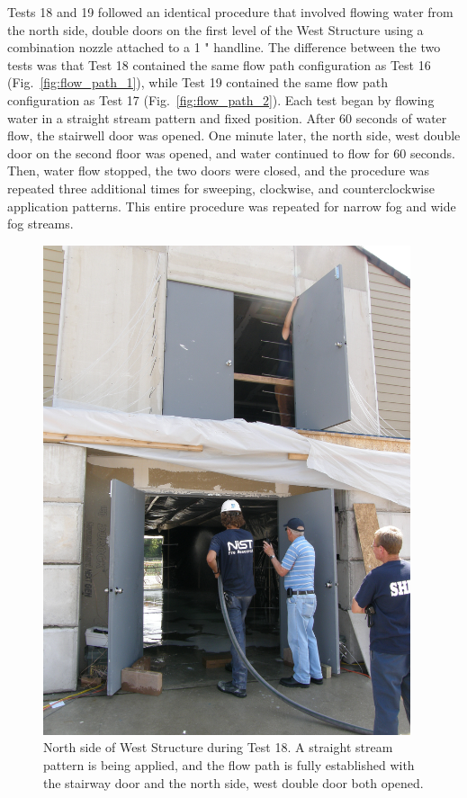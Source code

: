 \documentclass[12pt,oneside]{book}
\begin{document}
Tests 18 and 19 followed an identical procedure that involved flowing water from the north side, double doors on the first level of the West Structure using a combination nozzle attached to a 1 " handline. The difference between the two tests was that Test 18 contained the same flow path configuration as Test 16 (Fig.~\ref{fig:flow_path_1}), while Test 19 contained the same flow path configuration as Test 17 (Fig.~\ref{fig:flow_path_2}). Each test began by flowing water in a straight stream pattern and fixed position. After 60 seconds of water flow, the stairwell door was opened. One minute later, the north side, west double door on the second floor was opened, and water continued to flow for 60 seconds. Then, water flow stopped, the two doors were closed, and the procedure was repeated three additional times for sweeping, clockwise, and counterclockwise application patterns. This entire procedure was repeated for narrow fog and wide fog streams.

\begin{figure}[!ht]
\includegraphics[width=4.25in]{../Pictures/Test_18}
\caption[North Side of West Structure during Test 18]{North side of West Structure during Test 18. A straight stream pattern is being applied, and the flow path is fully established with the stairway door and the north side, west double door both opened.}
\label{fig:test_18_pic}
\end{figure}
\clearpage
\end{document}

